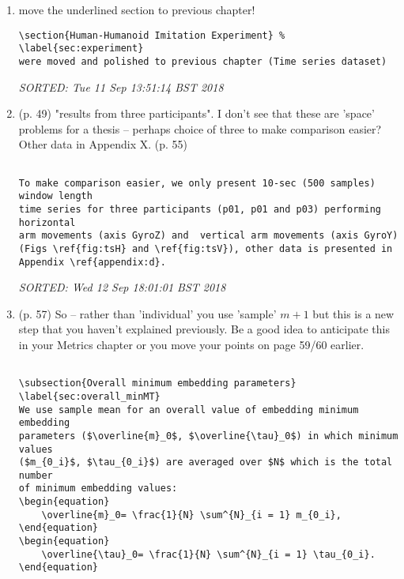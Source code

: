 \documentclass[10pt]{article}
\begin{document}
\begin{enumerate}[noitemsep,topsep=0pt]
\item move the underlined section to previous chapter!

\begin{verbatim}
\section{Human-Humanoid Imitation Experiment} % \label{sec:experiment}
were moved and polished to previous chapter (Time series dataset)
\end{verbatim}
\textit{
SORTED: 
Tue 11 Sep 13:51:14 BST 2018
}
\\




\item (p. 49) "results from three participants". 
	I don't see that these are 'space' problems for a thesis
	-- perhaps choice of three to make comparison easier?
	Other data in Appendix X. (p. 55)

\begin{verbatim}

To make comparison easier, we only present 10-sec (500 samples) window length 
time series for three participants (p01, p01 and p03) performing horizontal 
arm movements (axis GyroZ) and  vertical arm movements (axis GyroY) 
(Figs \ref{fig:tsH} and \ref{fig:tsV}), other data is presented in 
Appendix \ref{appendix:d}.

\end{verbatim}
\textit{
SORTED: 
Wed 12 Sep 18:01:01 BST 2018
}
\\




\item (p. 57) So -- rather than 'individual' you use 'sample' 
	$m+1$ 
	but this is a new step that you haven't explained previously.
	Be a good idea to anticipate this in your Metrics chapter
	or you move your points on page 59/60 earlier. 


\begin{verbatim}

\subsection{Overall minimum embedding parameters} \label{sec:overall_minMT}
We use sample mean for an overall value of embedding minimum embedding 
parameters ($\overline{m}_0$, $\overline{\tau}_0$) in which minimum values 
($m_{0_i}$, $\tau_{0_i}$) are averaged over $N$ which is the total number 
of minimum embedding values:
\begin{equation}
	\overline{m}_0= \frac{1}{N} \sum^{N}_{i = 1} m_{0_i},
\end{equation}
\begin{equation}
	\overline{\tau}_0= \frac{1}{N} \sum^{N}_{i = 1} \tau_{0_i}.
\end{equation}



\end{verbatim}
\end{enumerate}
\end{document}
